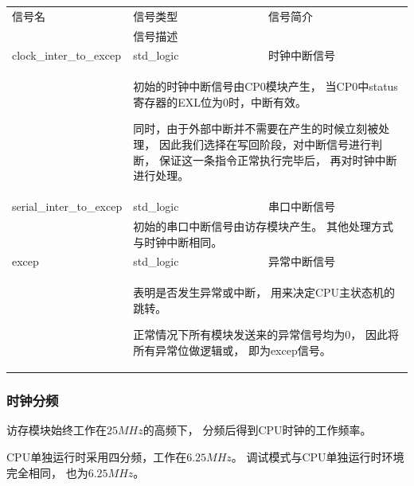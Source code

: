             \begin{tabularx}{\textwidth}{lll}
                \toprule
                信号名          & 信号类型  & 信号简介 \\
                \cmidrule(l){2-3}
                &
                \multicolumn{2}{X}{信号描述} \\
                \midrule
                clock\_inter\_to\_excep   & std\_logic    & 时钟中断信号 \\
                \cmidrule(l){2-3}
                &
                \multicolumn{2}{X}{
                    初始的时钟中断信号由CP0模块产生，%
                    当CP0中status寄存器的EXL位为0时，中断有效。

                    同时，由于外部中断并不需要在产生的时候立刻被处理，%
                    因此我们选择在写回阶段，对中断信号进行判断，%
                    保证这一条指令正常执行完毕后，%
                    再对时钟中断进行处理。
                } \\
                \midrule
                serial\_inter\_to\_excep   & std\_logic    & 串口中断信号 \\
                \cmidrule(l){2-3}
                &
                \multicolumn{2}{X}{
                    初始的串口中断信号由访存模块产生。%
                    其他处理方式与时钟中断相同。
                } \\
                \midrule
                excep   & std\_logic    & 异常中断信号 \\
                \cmidrule(l){2-3}
                &
                \multicolumn{2}{X}{
                    表明是否发生异常或中断，%
                    用来决定CPU主状态机的跳转。%

                    正常情况下所有模块发送来的异常信号均为0，%
                    因此将所有异常位做逻辑或，%
                    即为excep信号。
                } \\
                \bottomrule
            \end{tabularx}

        \subsubsection{时钟分频}
            访存模块始终工作在$25MHz$的高频下，
            分频后得到CPU时钟的工作频率。
    
            CPU单独运行时采用四分频，工作在$6.25MHz$。
            调试模式与CPU单独运行时环境完全相同，
            也为$6.25MHz$。
